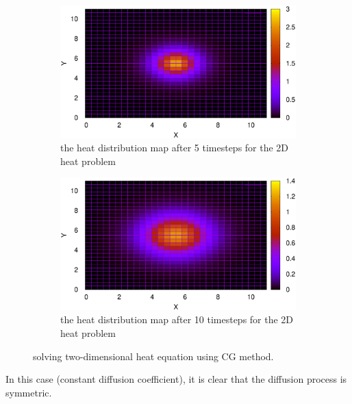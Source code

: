 \begin{figure}
     \centering
     \begin{subfigure}[b]{0.5\textwidth}
         \centering
         \includegraphics[width=\textwidth]{2DSimplefig/05_map}
		\caption{the heat distribution map after 5 timesteps for the 2D heat problem}
		\label{fig:2d-5dt}
     \end{subfigure}
     \hfill
	\centering
     \begin{subfigure}[b]{0.5\textwidth}
         \centering
         \includegraphics[width=\textwidth]{2DSimplefig/10_map}
		\caption{the heat distribution map after 10 timesteps for the 2D heat problem}
		\label{fig:2d-10dt}
     \end{subfigure}
     \hfill     
        \caption{solving two-dimensional heat equation using CG method.}
        \label{fig:2d-CG}
\end{figure}



In this case (constant diffusion coefficient), it is clear that the diffusion process is symmetric.
 \\

